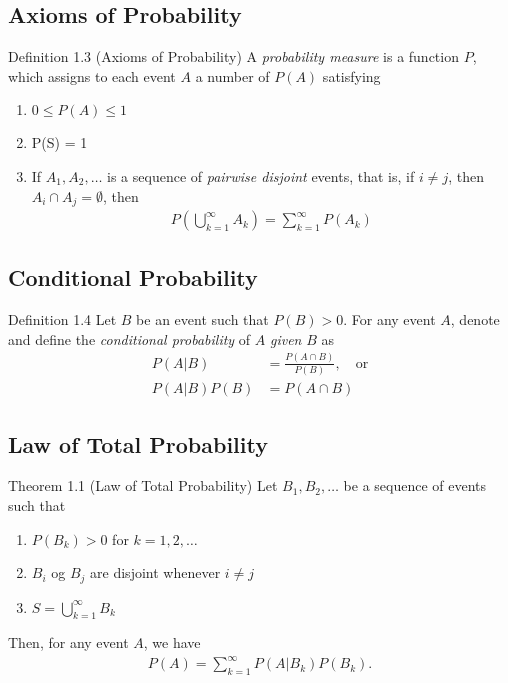 \subsection{Axioms of Probability}
\begin{boks}{Definition 1.3 (Axioms of Probability)}
  A \textit{probability measure} is a function $P$, which assigns to each event $A$ a number of $P(A)$ satisfying
  \begin{enumerate}[label = \textbf{(\alph*)}]
    \item $0 \leq P(A) \leq 1$
    \item P(S) = 1
    \item If $A_1, A_2, \ldots$ is a sequence of \textit{pairwise disjoint} events, that is, if $i \neq j$, then $A_i \cap A_j = \emptyset$, then
    \begin{align*}
      P\left( \bigcup_{k = 1}^\infty A_k \right) = \sum_{k = 1}^\infty P(A_k)
    \end{align*}
  \end{enumerate}
\end{boks}
\subsection{Conditional Probability}
\begin{boks}{Definition 1.4}
  Let $B$ be an event such that $P(B) > 0$. For any event $A$, denote and define the \textit{conditional probability} of $A$ \textit{given} $B$ as
  \begin{align*}
    P(A|B) &= \frac{P(A \cap B)}{P(B)}, \quad \text{or}\\
    P(A|B)P(B) &= P(A \cap B)
  \end{align*}
\end{boks}

\subsection{Law of Total Probability}
\begin{boks}{Theorem 1.1 (Law of Total Probability)}
    Let $B_1, B_2, \ldots$ be a sequence of events such that
    \begin{enumerate}
        \item $P(B_k) > 0$ for $k = 1, 2, \ldots$
        \item $B_i$ og $B_j$ are disjoint whenever $i \neq j$
        \item $S = \bigcup_{k=1}^\infty B_k$
    \end{enumerate}
    Then, for any event $A$, we have
    \begin{align*}
        P(A) = \sum_{k=1}^\infty P(A|B_k)P(B_k).
    \end{align*}
\end{boks}

